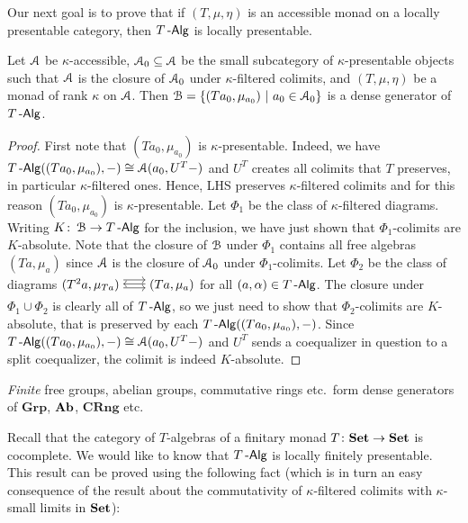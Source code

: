 \documentclass[a4paper,11pt,oneside,openany]{scrbook}
\begin{document}
Our next goal is to prove that if $(T,\mu,\eta)$ is an accessible monad on a locally presentable category, then $T\operatorname{-\mathsf{Alg}}$ is locally presentable.
\begin{prop}
	Let $\operatorname{\mathcal{A}}$ be $\kappa$-accessible, $\operatorname{\mathcal{A}}_0\subseteq\operatorname{\mathcal{A}}$ be the small subcategory of $\kappa$-presentable objects such that $\operatorname{\mathcal{A}}$ is the closure of $\operatorname{\mathcal{A}}_0$ under $\kappa$-filtered colimits, and $(T,\mu,\eta)$ be a monad of rank $\kappa$ on $\operatorname{\mathcal{A}}$. Then $\operatorname{\mathcal{B}}=\{ (Ta_0,\mu_{a_0})\ | \ a_0\in\operatorname{\mathcal{A}}_0 \}$ is a dense generator of $T\operatorname{-\mathsf{Alg}}$.
\end{prop}
\begin{proof}
	First note that $(Ta_0,\mu_{a_0})$ is $\kappa$-presentable. Indeed, we have $T\operatorname{-\mathsf{Alg}}((Ta_0,\mu_{a_0}),-)\cong\operatorname{\mathcal{A}}(a_0,U^T-)$ and $U^T$ creates all colimits that $T$ preserves, in particular $\kappa$-filtered ones. Hence, LHS preserves $\kappa$-filtered colimits and for this reason $(Ta_0,\mu_{a_0})$ is $\kappa$-presentable. Let $\Phi_1$  be the class of $\kappa$-filtered diagrams. Writing $K\colon\operatorname{\mathcal{B}}\to T\operatorname{-\mathsf{Alg}}$ for the inclusion, we have just shown that $\Phi_1$-colimits are $K$-absolute. Note that the closure of $\operatorname{\mathcal{B}}$ under $\Phi_1$ contains all free algebras $(Ta,\mu_a)$ since $\operatorname{\mathcal{A}}$ is the closure of $\operatorname{\mathcal{A}}_0$ under $\Phi_1$-colimits. Let $\Phi_2$ be the class of diagrams $\hspace{-1.5mm}\begin{tikzcd}
			(T^2a,\mu_{Ta})\hspace{-1.5mm}\arrow[r, shift right=.5ex, shorten <= .3em, shorten >= .3em]  \arrow[r, shift left=1ex, shorten <= .3em, shorten >= .3em] & \hspace{-1.5mm}(Ta,\mu_a)\arrow[l, shift right=.25ex, shorten <=.3em, shorten >=.3em]
		\end{tikzcd}\hspace{-1.5mm}$ for all $(a,\alpha)\in T\operatorname{-\mathsf{Alg}}$. The closure under $\Phi_1\cup\Phi_2$ is clearly all of $T\operatorname{-\mathsf{Alg}}$, so we just need to show that $\Phi_2$-colimits are $K$-absolute, that is preserved by each $T\operatorname{-\mathsf{Alg}}((Ta_0,\mu_{a_0}),-)$. Since $T\operatorname{-\mathsf{Alg}}((Ta_0,\mu_{a_0}),-)\cong\operatorname{\mathcal{A}}(a_0, U^T-)$ and $U^T$ sends a coequalizer in question to a split coequalizer, the colimit is indeed $K$-absolute.
\end{proof}
\begin{exmp}
	\emph{Finite} free groups, abelian groups, commutative rings etc.\ form dense generators of $\mathbf{Grp}$, ${\normalfont\textbf{Ab}}$, $\mathbf{CRng}$ etc.
\end{exmp}
Recall that the category of $T$-algebras of a finitary monad $T\colon{\normalfont\textbf{Set}}\to{\normalfont\textbf{Set}}$ is cocomplete. We would like to know that $T\operatorname{-\mathsf{Alg}}$ is locally finitely presentable. This result can be proved using the following fact (which is in turn an easy consequence of the result about the commutativity of $\kappa$-filtered colimits with $\kappa$-small limits in ${\normalfont\textbf{Set}}$):
\end{document}
